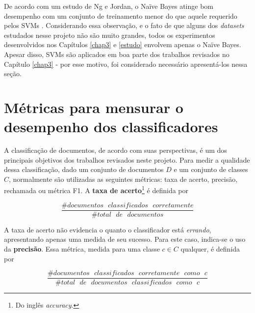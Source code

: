 De acordo com um estudo de Ng e Jordan, o Naïve Bayes atinge bom desempenho com um conjunto de treinamento menor do que aquele requerido pelos SVMs \cite{ng-jordan}. Considerando essa observação, e o fato de que alguns dos \emph{datasets} estudados nesse projeto não são muito grandes, todos os experimentos desenvolvidos nos Capítulos \ref{chap3} e \ref{estudo} envolvem apenas o Naïve Bayes. Apesar disso, SVMs são aplicados em boa parte dos trabalhos revisados no Capítulo \ref{chap3} - por esse motivo, foi considerado necessário apresentá-los nessa seção.




\section{Métricas para mensurar o desempenho dos classificadores}
\label{metricas}

A classificação de documentos, de acordo com suas perspectivas, é um dos principais objetivos dos trabalhos revisados neste projeto. Para medir a qualidade dessa classificação, dado um conjunto de documentos \ensuremath{D} e um conjunto de classes \ensuremath{C}, normalmente são utilizadas as seguintes métricas: taxa de acerto, precisão, rechamada ou métrica F1. A \textbf{taxa de acerto}\footnote{Do inglês \emph{accuracy}.} é definida por \cite{manning}

\begin{equation}
\label{accuracy}
\ensuremath{\frac{\#documentos\mbox{ }classificados\mbox{ }corretamente}{\#total\mbox{ }de\mbox{ }documentos}}
\end{equation}

A taxa de acerto não evidencia o quanto o classificador está \emph{errando}, apresentando apenas uma medida de seu sucesso. Para este caso, indica-se o uso da \textbf{precisão}. Essa métrica, medida para uma classe \ensuremath{c \in C} qualquer, é definida por \cite{manning}

\begin{equation}
\label{precision}
\ensuremath{\frac{\#documentos\mbox{ }classificados\mbox{ }corretamente\mbox{ }como\mbox{ }c}{\#total\mbox{ }de\mbox{ }documentos\mbox{ }classificados\mbox{ }como\mbox{ }c}}
\end{equation}

